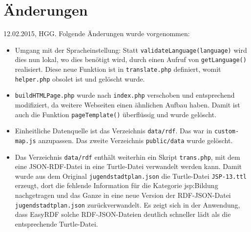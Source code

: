 \documentclass[11pt,a4paper]{article}
\begin{document}
\section{Änderungen}

12.02.2015, HGG. Folgende Änderungen wurde vorgenommen:
\begin{itemize}
\item Umgang mit der Spracheinstellung: Statt
  \texttt{validateLanguage(language)} wird dies nun lokal, wo dies benötigt
  wird, durch einen Aufruf von \texttt{getLanguage()} realisiert.  Diese neue
  Funktion ist in \texttt{translate.php} definiert, womit \texttt{helper.php}
  obsolet ist und gelöscht wurde.
\item \texttt{buildHTMLPage.php} wurde nach \texttt{index.php} verschoben und
  entsprechend modifiziert, da weitere Webseiten einen ähnlichen Aufbau haben.
  Damit ist auch die Funktion \texttt{pageTemplate()} überflüssig und wurde
  gelöscht. 
\item Einheitliche Datenquelle ist das Verzeichnis \texttt{data/rdf}.  Das war
  in \texttt{custom-map.js} anzupassen. Das zweite Verzeichnis
  \texttt{public/data} wurde gelöscht.
\item Das Verzeichnis \texttt{data/rdf} enthält weiterhin ein Skript
  \texttt{trans.php}, mit dem eine JSON-RDF-Datei in eine Turtle-Datei
  verwandelt werden kann.  Damit wurde aus dem Original
  \texttt{jugendstadtplan.json} die Turtle-Datei \texttt{JSP-13.ttl} erzeugt,
  dort die fehlende Information für die Kategorie jsp:Bildung nachgetragen und
  das Ganze in eine neue Version der RDF-JSON-Datei
  \texttt{jugendstadtplan.json} zurückverwandelt.  Es zeigt sich in der
  Anwendung, dass EasyRDF solche RDF-JSON-Dateien deutlich schneller lädt als
  die entsprechende Turtle-Datei. 
\end{itemize}
\end{document}
